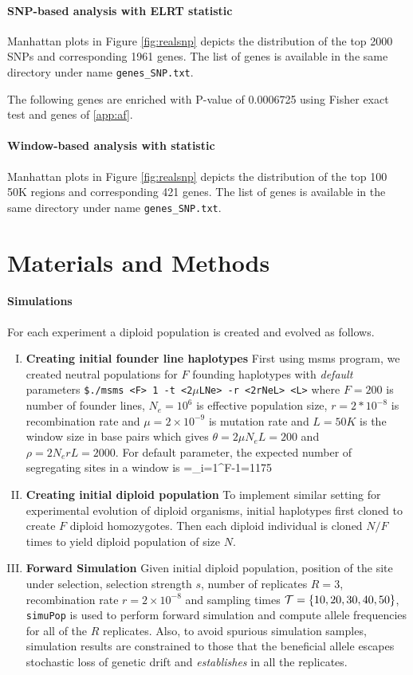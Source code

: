 \documentclass[11pt]{article}
\def\comale{\text{COMALE }}
\begin{document}
\paragraph{SNP-based analysis with ELRT statistic}
Manhattan plots in Figure \ref{fig:realsnp} depicts the distribution of the top 2000 SNPs and corresponding 1961 genes. The list of genes is available in the same directory under name \texttt{genes\_SNP.txt}.

The following genes are enriched with P-value of 0.0006725 using Fisher exact test and genes of \ref{app:af}.


\paragraph{Window-based analysis with \comale statistic}
Manhattan plots in Figure \ref{fig:realsnp} depicts the distribution of the top 100 50K regions and corresponding 421 genes. The list of genes is available in the same directory under name \texttt{genes\_SNP.txt}.

\section{Materials and Methods}
\paragraph{Simulations}
For each experiment a diploid population is created and evolved as 
follows. 
\begin{enumerate}[I.]
	\item {\bf Creating initial founder line haplotypes}
	First using msms program, we created neutral populations for $F$ 
	founding 
	haplotypes with \emph{default} parameters \texttt{\$./msms <F> 1 
	-t 
		<2$\mu$LNe> 
		-r <2rNeL> 
		<L>} 
	where $F=200$ is number of founder lines, $N_e=10^6$ is 
	effective 
	population size, $r=2*10^{-8}$ is recombination rate and 
	$\mu=2\times 
	10^{-9}$ is mutation rate and  $L=50K$ is the window size in 
	base pairs 
	which gives $\theta=2\mu N_eL=200$ and $\rho=2N_erL=2000$. 
	For 
	default 
	parameter, the expected number of segregating sites in a window 
	is 
	\beqq
	\Ebb[M]=\theta \sum_{i=1}^{F-1}=1175
	\eeqq
	\item{\bf Creating initial diploid population} 
	To implement similar setting for experimental evolution of diploid 
	organisms, 
	initial  haplotypes first cloned to create $F$ diploid homozygotes. 
	Then 
	each 
	diploid individual is  cloned $N/F$ times to yield diploid 
	population of 
	size 
	$N$.
	\item{\bf Forward Simulation}
	Given initial diploid population, position of the site under 
	selection, 
	selection 
	strength $s$, number of replicates $R=3$, recombination rate 
	$r=2\times10^{-8}$ 
	and sampling times ${\cal T}=\{10,20,30,40,50\}$, \texttt{simuPop} is 
	used to 
	perform
	forward simulation and  compute allele frequencies for all of the 
	$R$ 
	replicates. Also, to avoid spurious simulation samples, simulation 
	results 
	are constrained to those that the beneficial allele escapes 
	stochastic loss 
	of genetic drift and \emph{establishes} in all the replicates. 
\end{enumerate}
\end{document}
